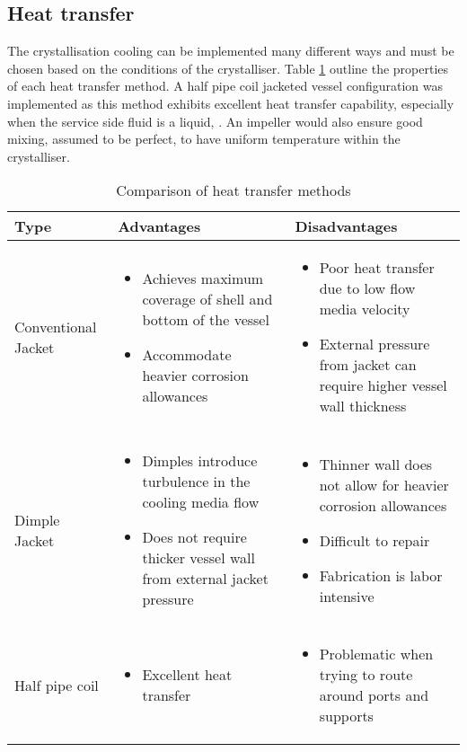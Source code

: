 \subsection{Heat transfer}

The crystallisation cooling can be implemented many different ways and must be chosen based on the conditions of the crystalliser. Table \ref{tab:heatransfermethodstype} outline the properties of each heat transfer method. A half pipe coil jacketed vessel configuration was implemented as this method exhibits excellent heat transfer capability, especially when the service side fluid is a liquid, . An impeller would also ensure good mixing, assumed to be perfect, to have uniform temperature within the crystalliser. 

\begin{table}
\caption{Comparison of heat transfer methods \cite{myerson_handbook_2019} }
\label{tab:heatransfermethodstype}
\begin{tabularx}{\linewidth}{XXX}
\toprule
Type & Advantages                 & Disadvantages                               \\ \midrule
Conventional Jacket & \begin{itemize}[label=+,leftmargin=1em]
  \item Achieves maximum coverage of shell and bottom of the vessel
  \item Accommodate heavier corrosion allowances
\end{itemize} & \begin{itemize}[label=-,leftmargin=1em]
  \item Poor heat transfer due to low flow media velocity
  \item External pressure from jacket can require higher vessel wall thickness 
\end{itemize} \\\midrule 
Dimple Jacket & \begin{itemize}[label=+,leftmargin=1em]
  \item Dimples introduce turbulence in the cooling media flow
  \item Does not require thicker vessel wall from external jacket pressure
\end{itemize} & \begin{itemize}[label=-,leftmargin=1em]
  \item Thinner wall does not allow for heavier corrosion allowances
  \item Difficult to repair
  \item Fabrication is labor intensive
\end{itemize} \\\midrule
Half pipe coil  &  \begin{itemize}[label=+,leftmargin=1em]
  \item Excellent heat transfer
\end{itemize} & \begin{itemize}[label=-,leftmargin=1em]
  \item Problematic when trying to route around ports and supports 


\end{itemize}
\end{tabularx}
\end{table}

